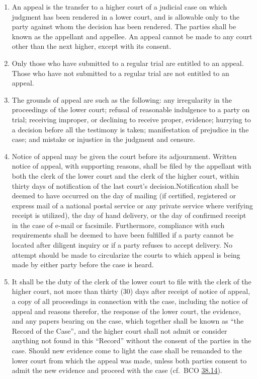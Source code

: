 \documentclass[
]{book}
\providecommand{\tightlist}{%
  \setlength{\itemsep}{0pt}\setlength{\parskip}{0pt}}
\begin{document}
\begin{enumerate}
\def\labelenumi{\arabic{enumi}.}
\tightlist
\item
  \protect\hypertarget{45}{\href{}{}}An appeal is the transfer to a higher court of a judicial case on which judgment has been rendered in a lower court, and is allowable only to the party against whom the decision has been rendered. The parties shall be known as the appellant and appellee. An appeal cannot be made to any court other than the next higher, except with its consent.
\item
  Only those who have submitted to a regular trial are entitled to an appeal. Those who have not submitted to a regular trial are not entitled to an appeal.
\item
  The grounds of appeal are such as the following: any irregularity in the proceedings of the lower court; refusal of reasonable indulgence to a party on trial; receiving improper, or declining to receive proper, evidence; hurrying to a decision before all the testimony is taken; manifestation of prejudice in the case; and mistake or injustice in the judgment and censure.
\item
  Notice of appeal may be given the court before its adjournment. Written notice of appeal, with supporting reasons, shall be filed by the appellant with both the clerk of the lower court and the clerk of the higher court, within thirty days of notification of the last court's decision.Notification shall be deemed to have occurred on the day of mailing (if certified, registered or express mail of a national postal service or any private service where verifying receipt is utilized), the day of hand delivery, or the day of confirmed receipt in the case of e-mail or facsimile. Furthermore, compliance with such requirements shall be deemed to have been fulfilled if a party cannot be located after diligent inquiry or if a party refuses to accept delivery. No attempt should be made to circularize the courts to which appeal is being made by either party before the case is heard.
\item
  It shall be the duty of the clerk of the lower court to file with the clerk of the higher court, not more than thirty (30) days after receipt of notice of appeal, a copy of all proceedings in connection with the case, including the notice of appeal and reasons therefor, the response of the lower court, the evidence, and any papers bearing on the case, which together shall be known as ``the Record of the Case'', and the higher court shall not admit or consider anything not found in this ``Record'' without the consent of the parties in the case. Should new evidence come to light the case shall be remanded to the lower court from which the appeal was made, unless both parties consent to admit the new evidence and proceed with the case (cf.~BCO \protect\hyperlink{38.14}{38.14}).

\end{enumerate}
\end{document}
